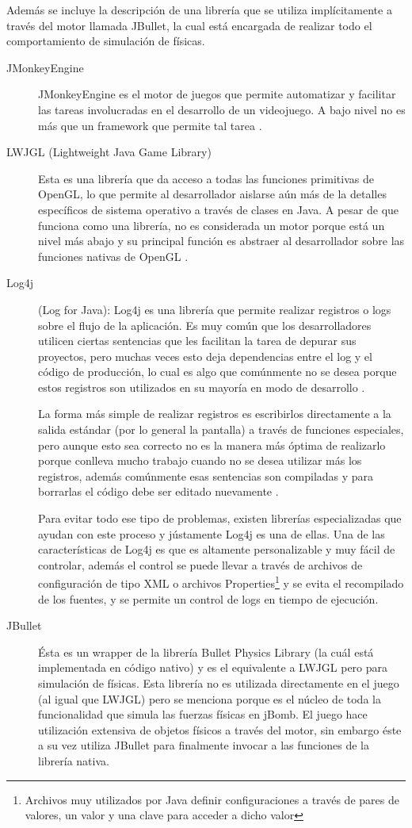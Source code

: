 \documentclass[a4paper,12pt,openany,oneside]{book}
\begin{document}
Además se incluye la descripción de una librería que se utiliza implícitamente a través del motor llamada JBullet, la cual está encargada de realizar todo el comportamiento de simulación de físicas.
\begin{description}
\item[JMonkeyEngine] JMonkeyEngine es el motor de juegos que permite automatizar y facilitar las tareas involucradas en el desarrollo de un videojuego. A bajo nivel no es más que un framework que permite tal tarea \cite{JMONKEY}.
\item[LWJGL (Lightweight Java Game Library)] Esta es una librería que da acceso a todas las funciones primitivas de OpenGL, lo que permite al desarrollador aislarse aún más de la detalles específicos de sistema operativo a través de clases en Java. A pesar de que funciona como una librería, no es considerada un motor porque está un nivel más abajo y su principal función es abstraer al desarrollador sobre las funciones nativas de OpenGL \cite{LWJGL}.
\item[Log4j](Log for Java): Log4j es una librería que permite realizar registros o logs sobre el flujo de la aplicación. Es muy común que los desarrolladores utilicen ciertas sentencias que les facilitan la tarea de depurar sus proyectos, pero muchas veces esto deja dependencias entre el log y el código de producción, lo cual es algo que comúnmente no se desea porque estos registros son utilizados en su mayoría en modo de desarrollo \cite{LOG}.

La forma más simple de realizar registros es escribirlos directamente a la salida estándar (por lo general la pantalla) a través de funciones especiales, pero aunque esto sea correcto no es la manera más óptima de realizarlo porque conlleva mucho trabajo cuando no se desea utilizar más los registros, además comúnmente esas sentencias son compiladas y para borrarlas el código debe ser editado nuevamente \cite{LOG}.

Para evitar todo ese tipo de problemas, existen librerías especializadas que ayudan con este proceso y jústamente Log4j es una de ellas.
Una de las características de Log4j es que es altamente personalizable y muy fácil de controlar, además el control se puede llevar a través de archivos de configuración de tipo XML o archivos Properties\footnote{Archivos muy utilizados por Java definir configuraciones a través de pares de valores, un valor y una clave para acceder a dicho valor} y se evita el recompilado de los fuentes, y se permite un control de logs en tiempo de ejecución.
\item[JBullet] Ésta es un wrapper de la librería Bullet Physics Library (la cuál está implementada en código nativo) y es el equivalente a LWJGL pero para simulación de físicas. Esta librería no es utilizada directamente en el juego (al igual que LWJGL) pero se menciona porque es el núcleo de toda la funcionalidad que simula las fuerzas físicas en jBomb. El juego hace utilización extensiva de objetos físicos a través del motor, sin embargo éste a su vez utiliza JBullet para finalmente invocar a las funciones de la librería nativa.
\end{description}
\end{document}
